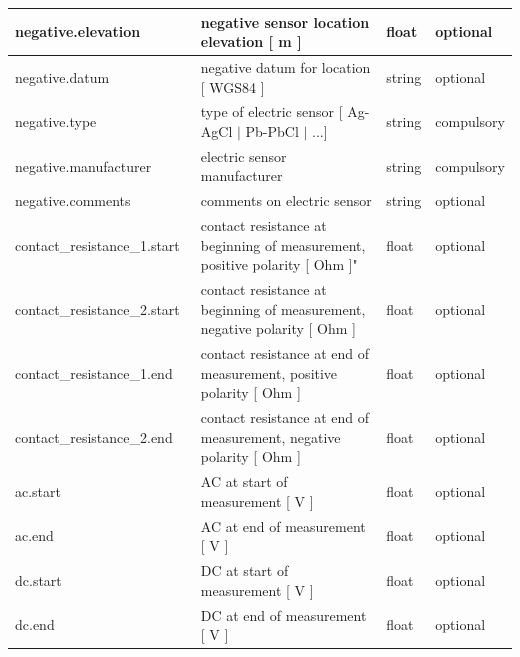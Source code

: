\documentclass{article}
\begin{document}
\begin{table}[htb!]
\begin{tabular}{|l|p{3in}|l|l|}
        negative.elevation\ & negative sensor location elevation [ m ] & float & optional \\ \hline
        negative.datum\ & negative datum for location [ WGS84 ] & string & optional \\ \hline
        negative.type\ & type of electric sensor [ Ag-AgCl $|$ Pb-PbCl $|$ ...] & string & compulsory \\ \hline
        negative.manufacturer\ & electric sensor manufacturer & string & compulsory \\ \hline
        negative.comments\ & comments on electric sensor & string & optional \\ \hline
        contact\_resistance\_1.start\ & contact resistance at beginning of measurement, positive polarity [ Ohm ]" & float & optional \\ \hline
        contact\_resistance\_2.start\ & contact resistance at beginning of measurement, negative polarity [ Ohm ] & float & optional \\ \hline
        contact\_resistance\_1.end\ & contact resistance at end of measurement, positive polarity [ Ohm ] & float & optional \\ \hline
        contact\_resistance\_2.end\ & contact resistance at end of measurement, negative polarity [ Ohm ] & float & optional \\ \hline
        ac.start\ & AC at start of measurement [ V ] & float & optional \\ \hline
        ac.end\ & AC at end of measurement [ V ] & float & optional \\ \hline
        dc.start\ & DC at start of measurement [ V ] & float & optional \\ \hline
        dc.end\ & DC at end of measurement [ V ] & float & optional \\ \hline
        
    \end{tabular}
    \label{tab:electric01}
\end{table}    
\end{document}
